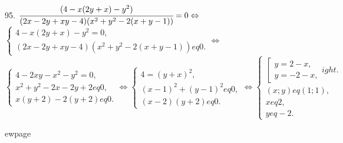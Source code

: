 95. $\cfrac{(4-x(2y+x)-y^2)}{(2x-2y+xy-4)(x^2+y^2-2(x+y-1))}=0\Leftrightarrow$\\$
\begin{cases}

4-x(2y+x)-y^2=0,\\
(2x-2y+xy-4)(x^2+y^2-2(x+y-1))
eq0.
\end{cases}\Leftrightarrow$\\$
\begin{cases}
4-2xy-x^2-y^2=0,\\
x^2+y^2-2x-2y+2
eq0,\\
x(y+2)-2(y+2)
eq0.
\end{cases}\Leftrightarrow
\begin{cases}
4=(y+x)^2,\\
(x-1)^2+(y-1)^2
eq0,\\
(x-2)(y+2)
eq0.
\end{cases}\Leftrightarrow
\begin{cases}
\left[\begin{array}{l}
y=2-x,\\
y=-2-x,
\end{array}
ight.\\
(x;y)
eq (1;1),\\
x
eq2,\\
y
eq-2.
\end{cases}$
\begin{figure}[ht!]
\end{figure}

ewpage
